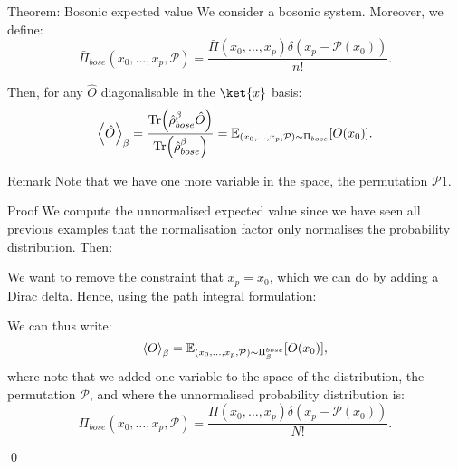 \documentclass[a4paper]{article}
\begin{document}
\begin{parag}{Theorem: Bosonic expected value}
    We consider a bosonic system. Moreover, we define:
    \[\bar{\Pi}_{bose}\left(x_0, \ldots, x_p, \mathcal{P}\right) = \frac{\bar{\Pi}\left(x_0, \ldots, x_p\right) \delta\left(x_p - \mathcal{P}\left(x_0\right)\right)}{n!}.\]

    Then, for any $\hat{O}$ diagonalisable in the $\ket{x}$ basis: 
    \[\left\langle \hat{O} \right\rangle_{\beta} = \frac{\Tr\left(\hat{\rho}_{bose}^{\beta} \hat{O}\right)}{\Tr\left(\hat{\rho}_{bose}^{\beta}\right)} = \exval_{\left(x_0, \ldots, x_p, \mathcal{P}\right) \followsdistr \Pi_{bose}}\left[O\left(x_0\right)\right].\]
   
    \begin{subparag}{Remark}
        Note that we have one more variable in the space, the permutation $\mathcal{P}$1.
    \end{subparag}

    \begin{subparag}{Proof}
        We compute the unnormalised expected value since we have seen all previous examples that the normalisation factor only normalises the probability distribution. Then:
        
        We want to remove the constraint that $x_p = x_0$, which we can do by adding a Dirac delta. Hence, using the path integral formulation:

        We can thus write: 
        \[\left\langle O \right\rangle_\beta = \exval_{\left(x_0, \ldots, x_p, \mathcal{P}\right) \followsdistr \Pi_{\beta}^{bose}} \left[O\left(x_0\right)\right],\]
        where note that we added one variable to the space of the distribution, the permutation $\mathcal{P}$, and where the unnormalised probability distribution is:
        \[\bar{\Pi}_{bose}\left(x_0, \ldots, x_p, \mathcal{P}\right) = \frac{\Pi\left(x_0, \ldots, x_p\right) \delta\left(x_p - \mathcal{P}\left(x_0\right)\right)}{N!}.\]

        \qed
    \end{subparag}
\end{parag}
\end{document}
